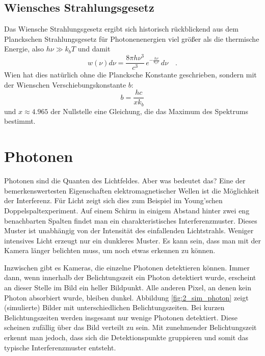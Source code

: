 \subsection{Wiensches Strahlungsgesetz}
Das Wiensche Strahlungsgesetz ergibt sich historisch rückblickend aus dem Planckschen Strahlungsgesetz für Photonenenergien viel größer als die thermische Energie, also $h \nu \gg k_b T$ und damit 
\begin{equation}
    w(\nu) d\nu    =  \frac{8 \pi h \nu^3}{c^3} \,  e^{- \frac{h \nu}{k_b T}} \, d\nu  \quad .
\end{equation}
Wien hat dies natürlich ohne die Plancksche Konstante geschrieben, sondern mit der Wienschen Verschiebungskonstante $b$:
\begin{equation}
    b = \frac{h c}{x k_b} 
\end{equation}
und $x \approx 4.965$ der Nullstelle eine Gleichung, die das Maximum des Spektrums bestimmt.


 \section{Photonen}

 Photonen sind die Quanten des Lichtfeldes. Aber was bedeutet das? Eine der bemerkenswertesten Eigenschaften elektromagnetischer Wellen ist die Möglichkeit der Interferenz. Für Licht zeigt sich dies zum Beispiel im Young'schen Doppelspaltexperiment. Auf einem Schirm in einigem Abstand hinter zwei eng benachbarten Spalten findet man ein charakteristisches Interferenzmuster.  Dieses Muster ist unabhängig von der Intensität des einfallenden Lichtstrahls. Weniger intensives Licht erzeugt nur ein dunkleres Muster. Es kann sein, dass man mit der Kamera länger belichten muss, um noch etwas erkennen zu können.

 Inzwischen gibt es Kameras, die einzelne Photonen detektieren können. Immer dann, wenn innerhalb der Belichtungszeit ein Photon detektiert wurde, erscheint an dieser Stelle im Bild ein heller Bildpunkt. Alle anderen Pixel, an denen kein Photon absorbiert wurde, bleiben dunkel. Abbildung  \ref{fig:2_sim_photon} zeigt (simulierte) Bilder mit unterschiedlichen Belichtungszeiten. Bei kurzen Belichtungszeiten werden insgesamt nur wenige Photonen detektiert. Diese scheinen zufällig über das Bild verteilt zu sein. Mit zunehmender Belichtungszeit erkennt man jedoch, dass sich die Detektionspunkte gruppieren und somit das typische Interferenzmuster entsteht.

